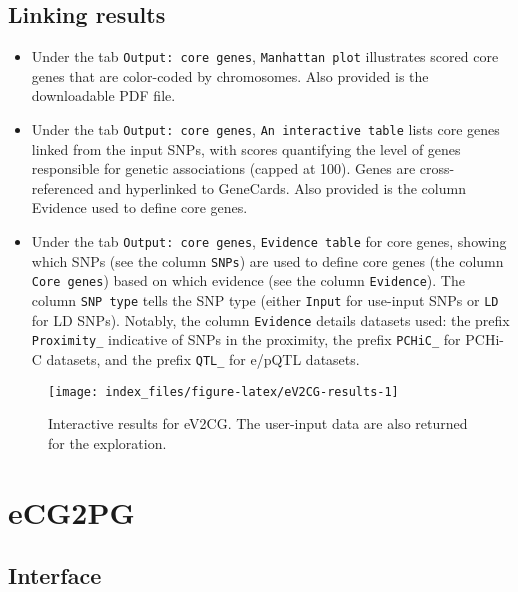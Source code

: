 \documentclass[
  oneside]{book}
\begin{document}
\hypertarget{linking-results}{%
\section{Linking results}\label{linking-results}}

\begin{itemize}
\item
  Under the tab \texttt{Output:\ core\ genes}, \texttt{Manhattan\ plot} illustrates scored core genes that are color-coded by chromosomes. Also provided is the downloadable PDF file.
\item
  Under the tab \texttt{Output:\ core\ genes}, \texttt{An\ interactive\ table} lists core genes linked from the input SNPs, with scores quantifying the level of genes responsible for genetic associations (capped at 100). Genes are cross-referenced and hyperlinked to GeneCards. Also provided is the column Evidence used to define core genes.
\item
  Under the tab \texttt{Output:\ core\ genes}, \texttt{Evidence\ table} for core genes, showing which SNPs (see the column \texttt{SNPs}) are used to define core genes (the column \texttt{Core\ genes}) based on which evidence (see the column \texttt{Evidence}). The column \texttt{SNP\ type} tells the SNP type (either \texttt{Input} for use-input SNPs or \texttt{LD} for LD SNPs). Notably, the column \texttt{Evidence} details datasets used: the prefix \texttt{Proximity\_} indicative of SNPs in the proximity, the prefix \texttt{PCHiC\_} for PCHi-C datasets, and the prefix \texttt{QTL\_} for e/pQTL datasets.
\end{itemize}

\begin{figure}

{\centering \texttt{[image: index\_files/figure-latex/eV2CG-results-1]} 

}

\caption{Interactive results for eV2CG. The user-input data are also returned for the exploration.}\label{fig:eV2CG-results}
\end{figure}

\hypertarget{ecg2pg}{%
\chapter{eCG2PG}\label{ecg2pg}}

\hypertarget{interface-1}{%
\section{Interface}\label{interface-1}}
\end{document}
